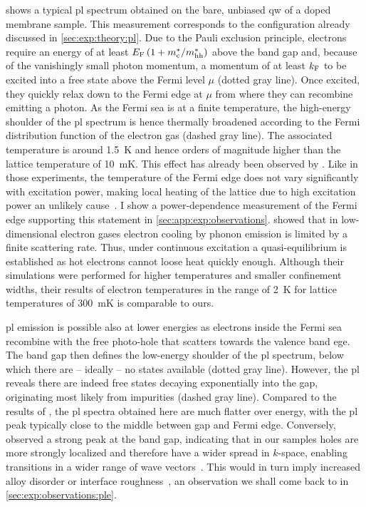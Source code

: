  shows a typical \gls{pl} spectrum obtained on the bare, unbiased \gls{qw} of a doped membrane sample.
This measurement corresponds to the configuration already discussed in \cref{sec:exp:theory:pl}.
Due to the Pauli exclusion principle, electrons require an energy of at least $E_{\mathrm{F}}\left(1 + m_{\mathrm{c}}^\ast/m_{\mathrm{hh}}^\ast\right)$ above the band gap and, because of the vanishingly small photon momentum, a momentum of at least $k_{\mathrm{F}}$ to be excited into a free state above the Fermi level $\mu$ (dotted gray line).
Once excited, they quickly relax down to the Fermi edge at $\mu$ from where they can recombine emitting a photon.
As the Fermi sea is at a finite temperature, the high-energy shoulder of the \gls{pl} spectrum is hence thermally broadened according to the Fermi distribution function of the electron gas (dashed gray line).
The associated temperature is around \qty{1.5}{\kelvin} and hence orders of magnitude higher than the lattice temperature of \qty{10}{\milli\kelvin}.
This effect has already been observed by \citet{Pinczuk1984}.
Like in those experiments, the temperature of the Fermi edge does not vary significantly with excitation power, making local heating of the lattice due to high excitation power an unlikely cause~\cite{Ulbrich1973}.
I show a power-dependence measurement of the Fermi edge supporting this statement in \cref{sec:app:exp:observations}.
\citet{Bockelmann1990} showed that in low-dimensional electron gases electron cooling by phonon emission is limited by a finite scattering rate.
Thus, under continuous excitation a quasi-equilibrium is established as hot electrons cannot loose heat quickly enough.
Although their simulations were performed for higher temperatures and smaller confinement widths, their results of electron temperatures in the range of \qty{2}{\kelvin} for lattice temperatures of \qty{300}{\milli\kelvin} is comparable to ours.

\Gls{pl} emission is possible also at lower energies as electrons inside the Fermi sea recombine with the free photo-hole that scatters towards the valence band ege.
The band gap then defines the low-energy shoulder of the \gls{pl} spectrum, below which there are -- ideally -- no states available (dotted gray line).
However, the \gls{pl} reveals there are indeed free states decaying exponentially into the gap, originating most likely from impurities (dashed gray line).
Compared to the results of \citet{Kamburov2017}, the \gls{pl} spectra obtained here are much flatter over energy, with the \gls{pl} peak typically close to the middle between gap and Fermi edge.
Conversely, \citet{Kamburov2017} observed a strong peak at the band gap,
indicating that in our samples holes are more strongly localized and therefore have a wider spread in $k$-space, enabling transitions in a wider range of wave vectors~\cite{Skolnick1987}.
This would in turn imply increased alloy disorder or interface roughness~\cite{Gabbay2008}, an observation we shall come back to in \cref{sec:exp:observations:ple}.

